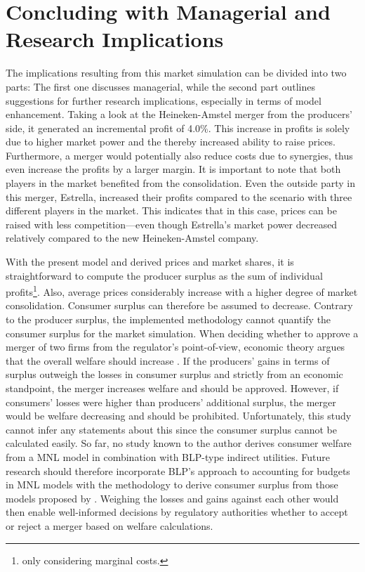 \documentclass[12pt,a4paper]{article}
\begin{document}
\section{Concluding with Managerial and Research Implications}
The implications resulting from this market simulation can be divided into two parts: The first one discusses managerial,
while the second part outlines suggestions for further research implications, especially in terms of model enhancement. 
Taking a look at the Heineken-Amstel merger from the producers' side, it generated an incremental profit of 4.0\%.
This increase in profits is solely due to higher market power and the thereby increased ability to raise prices.
Furthermore, a merger would potentially also reduce costs due to synergies, thus even increase the profits by a larger margin.
It is important to note that both players in the market benefited from the consolidation.
Even the outside party in this merger, Estrella, increased their profits compared to the scenario with three different players in the market.
This indicates that in this case, prices can be raised with less competition---even though Estrella's market power decreased relatively compared to the new Heineken-Amstel company.

With the present model and derived prices and market shares, it is straightforward to compute the producer surplus as the sum of individual profits\footnote{only considering marginal costs.}.
Also, average prices considerably increase with a higher degree of market consolidation.
Consumer surplus can therefore be assumed to decrease.
Contrary to the producer surplus, the implemented methodology cannot quantify the consumer surplus for the market simulation.
When deciding whether to approve a merger of two firms from the regulator's point-of-view, economic theory argues that the overall welfare should increase \citep{perryOligopolyIncentiveHorizontal1985}.
If the producers' gains in terms of surplus outweigh the losses in consumer surplus and strictly from an economic standpoint, the merger increases welfare and should be approved.
However, if consumers' losses were higher than producers' additional surplus, the merger would be welfare decreasing and should be prohibited.
Unfortunately, this study cannot infer any statements about this since the consumer surplus cannot be calculated easily.
So far, no study known to the author derives consumer welfare from a MNL model in combination with BLP-type indirect utilities.
Future research should therefore incorporate BLP's approach to accounting for budgets in MNL models with the methodology to derive consumer surplus from those models proposed by \cite{trainWelfareCalculationsDiscrete2015}.
Weighing the losses and gains against each other would then enable well-informed decisions by regulatory authorities whether to accept or reject a merger based on welfare calculations.
\end{document}
